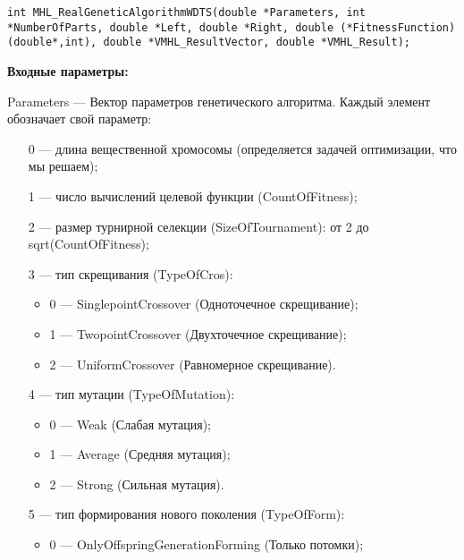 \documentclass[a4paper,12pt]{article}
\begin{document}
\begin{lstlisting}[label=code_syntax_MHL_RealGeneticAlgorithmWDTS,caption=Синтаксис]
int MHL_RealGeneticAlgorithmWDTS(double *Parameters, int *NumberOfParts, double *Left, double *Right, double (*FitnessFunction)(double*,int), double *VMHL_ResultVector, double *VMHL_Result);
\end{lstlisting}

\textbf{Входные параметры:}
 
Parameters --- Вектор параметров генетического алгоритма. Каждый элемент обозначает свой параметр:
 
 \begin{itemize}
 \item   [0] --- длина вещественной хромосомы (определяется задачей оптимизации, что мы решаем);
  \item   [1] --- число вычислений целевой функции (CountOfFitness);
   \item [2] --- размер турнирной селекции (SizeOfTournament): от 2 до sqrt(CountOfFitness);
 
 \item [3] --- тип скрещивания (TypeOfCros):
  \begin{itemize}
       \item 0 --- SinglepointCrossover (Одноточечное скрещивание);
 
       \item 1 --- TwopointCrossover (Двухточечное скрещивание);
 
       \item 2 --- UniformCrossover (Равномерное скрещивание).
	    \end{itemize}
 
 \item [4] --- тип мутации (TypeOfMutation):
  \begin{itemize}
       \item 0 --- Weak (Слабая мутация);
 
       \item 1 --- Average (Средняя мутация);
 
       \item 2 --- Strong (Сильная мутация).
	    \end{itemize}
 
 \item [5] --- тип формирования нового поколения (TypeOfForm):
  \begin{itemize}
       \item 0 --- OnlyOffspringGenerationForming (Только потомки);
 

\end{itemize}
\end{itemize}
\end{document}
